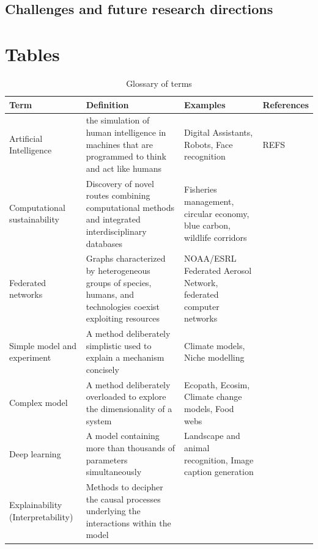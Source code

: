 \documentclass[12pt,a4paper]{article}
\begin{document}
\subsection{Challenges and future research directions}


\section{Tables}

\begin{table}[]
\begin{center}
\hspace{-0.8 in}\begin{tabular}{ |  p{2.6cm} | p{5cm} | p{4cm} | p{3cm} | }
\hline 
{\bf Term} & {\bf Definition} & {\bf Examples} & {\bf References} \tabularnewline
\hline 
Artificial Intelligence & the simulation of human intelligence in machines that are programmed to think and act like humans  & Digital Assistants, Robots, Face recognition & REFS \tabularnewline
\hline 
 Computational sustainability & Discovery of novel routes combining computational methods and integrated interdisciplinary databases & Fisheries management, circular economy, blue carbon, wildlife corridors &  \tabularnewline
\hline 
Federated networks & Graphs characterized by heterogeneous groups of species,
humans, and technologies coexist exploiting resources & NOAA/ESRL Federated Aerosol Network, federated computer networks &  \tabularnewline
\hline 
Simple model and experiment & A method deliberately simplistic used to explain a mechanism concisely & Climate models, Niche modelling & \tabularnewline
\hline 
 Complex model & A method deliberately overloaded to explore the dimensionality of a system & Ecopath, Ecosim, Climate change models, Food webs & \tabularnewline
\hline 
Deep learning & A model containing more than thousands of parameters simultaneously & Landscape and animal recognition, Image caption generation & \tabularnewline
\hline 
Explainability (Interpretability) & Methods to decipher the causal processes underlying the interactions within the model &  & \tabularnewline

\hline
\end{tabular}
\caption{Glossary of terms}
\end{center}
 \end{table}
\end{document}
